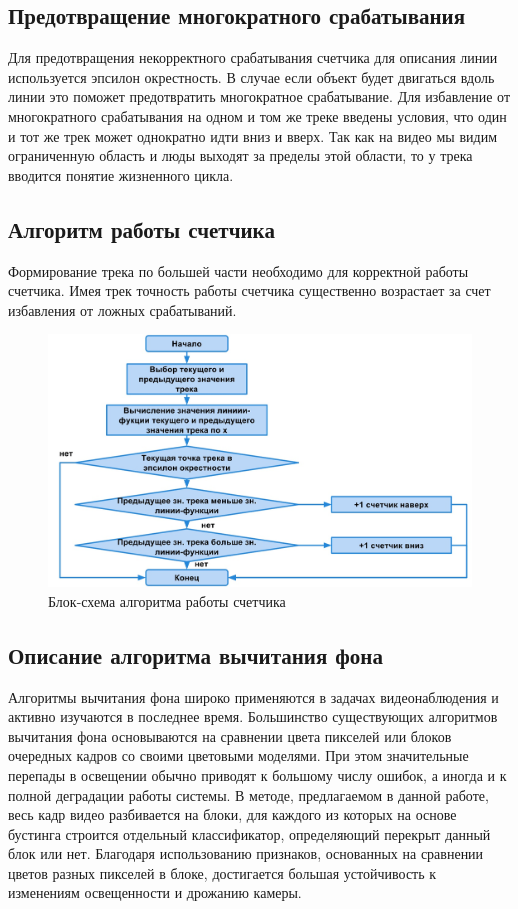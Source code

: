 \documentclass[12pt]{article}
\begin{document}
		\subsection{Предотвращение многократного срабатывания}
Для предотвращения некорректного срабатывания счетчика для описания линии используется эпсилон окрестность. В случае если объект будет двигаться вдоль линии это поможет предотвратить многократное срабатывание. Для избавление от многократного срабатывания на одном и том же треке введены условия, что один и тот же трек может однократно идти вниз и вверх. Так как на видео мы видим ограниченную область и люды выходят за пределы этой области, то у трека вводится понятие жизненного цикла. 
		\subsection{Алгоритм работы счетчика}
Формирование трека по большей части необходимо для корректной работы счетчика. Имея трек точность работы счетчика существенно возрастает за счет избавления от ложных срабатываний.
		\begin{figure}[h!]
			\centering
			\includegraphics[width=1\textwidth]{pic/counter.jpg}
			\caption{Блок-схема алгоритма работы счетчика}
		\end{figure}	

		\subsection{Описание алгоритма вычитания фона}
Алгоритмы вычитания фона широко применяются в задачах видеонаблюдения и активно изучаются в последнее время. Большинство существующих алгоритмов вычитания фона основываются на сравнении цвета пикселей или блоков очередных кадров со своими цветовыми моделями. При этом значительные перепады в освещении обычно приводят к большому числу ошибок, а иногда и к полной деградации работы системы. В методе, предлагаемом в данной работе, весь кадр видео разбивается на блоки, для каждого из которых на основе бустинга строится отдельный классификатор, определяющий перекрыт данный блок или нет. Благодаря использованию признаков, основанных на сравнении цветов разных пикселей в блоке, достигается большая устойчивость к изменениям освещенности и дрожанию камеры. 
\end{document}

